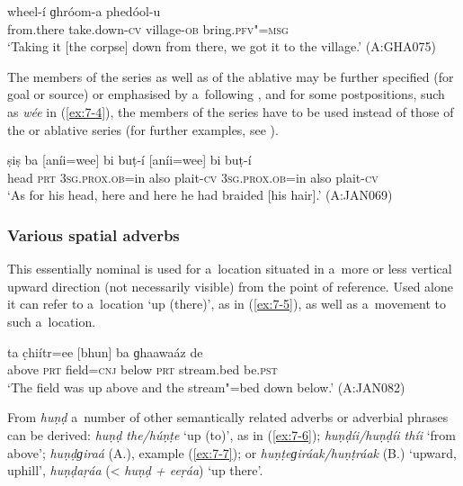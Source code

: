 \begin{exe}
\ex
\label{ex:7-3}
\gll [eetáai] wheel-í ɡhróom-a phedóol-u \\
from.there take.down-\textsc{cv} village-\textsc{ob} bring.\textsc{pfv"=msg} \\
\glt `Taking it [the corpse] down from there, we got it to the village.' (A:GHA075)
\end{exe}
The members of the  series as well as of the ablative may be further specified (for goal or
source) or emphasised by a~following , and for some postpositions, such as \textit{wée}
in (\ref{ex:7-4}), the members of the  series have to be used instead of those of the
 or ablative series (for further examples, see ).

\begin{exe}
\ex
\label{ex:7-4}
\gll ṣiṣ ba [aníi=wee] bi buṭ-í [aníi=wee]  bi buṭ-í \\
head \textsc{prt} \textsc{3sg.prox.ob=}in also plait-\textsc{cv} \textsc{3sg.prox.ob=}in also plait-\textsc{cv} \\
\glt `As for his head, here and here he had braided [his hair].' (A:JAN069)
\end{exe}

\subsubsection*{Various spatial adverbs}

 This essentially nominal  is used for a~location situated in a~more or less vertical upward direction (not necessarily visible) from the point of reference. Used alone it can refer to a~location `up (there)', as in (\ref{ex:7-5}), as well as a~movement to such a~location.

\begin{exe}
\ex
\label{ex:7-5}
\gll [huṇḍ] ta c̣hiítr=ee [bhun] ba ɡhaawaáz de  \\
above \textsc{prt} field=\textsc{cnj} below \textsc{prt} stream.bed be.\textsc{pst} \\
\glt `The field was up above and the stream"=bed down below.' (A:JAN082)
\end{exe}
From \textit{huṇḍ} a~number of other semantically related adverbs or adverbial phrases can be derived: \textit{huṇḍ the/húṇṭe} `up (to)', as in (\ref{ex:7-6}); \textit{huṇḍíi/huṇḍíi thíi} `from above'; \textit{huṇḍɡiraá} (A.), example (\ref{ex:7-7}); or \textit{huṇṭeɡiráak/huṇṭráak} (B.) `upward, uphill', \textit{huṇḍaṛáa} ({\textless} \textit{huṇḍ + eeṛáa}) `up there'.

